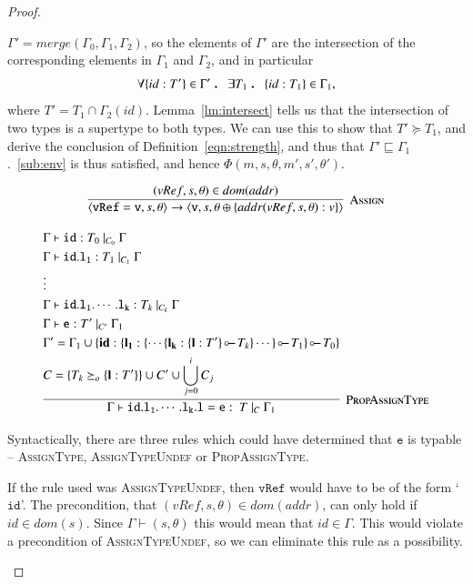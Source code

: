 \documentclass[12pt,a4paper,twoside,openright]{report}
\theoremstyle{definition}
\theoremstyle{dotless}
\newcommand*{\orig}{\ensuremath{\!\multimapinv\!}}
\newcommand{\transition}[6]{\langle{}\mathtt{#1},#2,#3\rangle{}\rightarrow{}\langle{}\mathtt{#4},#5,#6\rangle}
\newcommand\qdot{\mathbin{\scalebox{1.5}{.}}\enspace}
\begin{document}
\begin{proof}
\begin{case}[If2]
	$\Gamma'=merge(\Gamma_0,\Gamma_1,\Gamma_2)$, so the elements of $\Gamma'$
	are the intersection of the corresponding elements in $\Gamma_1$ and
	$\Gamma_2$, and in particular 
	$$\forall \{id:T'\}\in\Gamma'\qdot \exists T_1 \qdot \{id:T_1\}\in\Gamma_1,$$
   	where $T' =	T_1\cap\Gamma_2(id)$. Lemma~\ref{lm:intersect} tells us that the
	intersection of two types is a supertype to both types. We can use this to
	show that $T'\succeq T_1$, and 
	derive the conclusion of Definition~\ref{eqn:strength}, and thus that
	$\Gamma'\sqsubseteq\Gamma_1$.~\eqref{sub:env} is thus satisfied, and hence
	$\Phi(m,s,\theta,m',s',\theta')$.

  \end{case}

  \begin{case}[Assign]
	$$\infer[\textsc{Assign}]{
	  \transition{vRef = v}{s}{\theta}{v}{s}{\theta\oplus\{addr(vRef, s, \theta): v\}}	
	}{
		(vRef, s, \theta)\in dom(addr)	
	}$$

	  $$\infer[\textsc{PropAssignType}]{
  		\Gamma\vdash\mathtt{id.l_1.\cdots.l_k.l = e}:\ T\ |_C\ \Gamma_1
	  }{
  		\begin{split}
		  &\Gamma\vdash\mathtt{id}:T_0\ |_{C_0}\ \Gamma \\
		  &\Gamma\vdash\mathtt{id.l_1}:T_1\ |_{C_1}\ \Gamma \\
		  &\vdots \\
		  &\Gamma\vdash\mathtt{id.l_1.\cdots.l_k}:T_k\ |_{C_k}\ \Gamma \\
		  &\Gamma\vdash\mathtt{e}:T'\ |_{C'}\ \Gamma_1 \\
		  &\Gamma' = \Gamma_1\cup\{\textbf{id}: \{ \mathbf{l_1}: \{\cdots \{\mathbf{l_k}:\{\mathbf{l}: T'\}\orig T_k \} \cdots\} \orig T_1\}\orig T_0\} \\
		  &C = \{T_k \succeq_o \{\mathbf{l}:T'\}\} \cup C' \cup \bigcup_{j=0}^{i}{C_j}
  		\end{split}
	  }$$

	Syntactically, there are three rules which could have determined that
	$\mathtt{e}$ is typable -- \textsc{AssignType}, \textsc{AssignTypeUndef} or
	\textsc{PropAssignType}. 
	
	If the rule used was \textsc{AssignTypeUndef}, then $\mathtt{vRef}$ would
	have to be of the form `$\mathtt{id}$'. The precondition, that $(vRef,s,
	\theta)\in dom(addr)$, can only hold if $id\in dom(s)$. Since
	$\Gamma\vdash(s,\theta)$ this would mean that $id\in\Gamma$. This would
	violate a precondition of \textsc{AssignTypeUndef}, so we can eliminate
	this rule as a possibility.
  

\end{case}
\end{proof}
\end{document}
